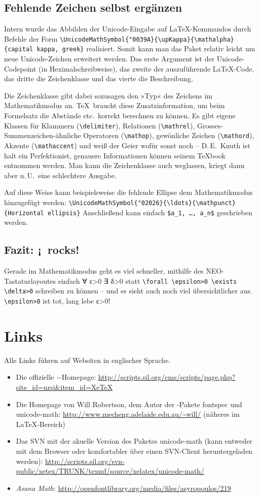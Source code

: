 \documentclass{scrartcl}
\begin{document}
\subsection{Fehlende Zeichen selbst ergänzen}
Intern wurde das Abbilden der Unicode-Eingabe auf \LaTeX-Kommandos durch Befehle der Form
\verb|\UnicodeMathSymbol{"0039A}{\upKappa}{\mathalpha}{capital kappa, greek}|
realisiert. Somit kann man das Paket relativ leicht um neue Unicode-Zeichen erweitert werden. Das erste Argument ist der Unicode-Codepoint (in Heximalschreibweise), das zweite der auszuführende \LaTeX-Code, das dritte die Zeichenklasse und das vierte die Beschreibung.

Die Zeichenklasse gibt dabei sozusagen den »Typ« des Zeichens im Mathematikmodus an. \TeX\ braucht diese Zusatzinformation, um beim Formelsatz die Abstände etc.\ korrekt berechnen zu können. Es gibt eigene Klassen für Klammern (\verb|\delimiter|), Relationen (\verb|\mathrel|), Grosses-Summenzeichen-ähnliche Operatoren (\verb|\mathop|), gewönliche Zeichen (\verb|\mathord|), Akzente (\verb|\mathaccent|) und weiß der Geier wofür sonst noch – D.\,E.~Knuth ist halt ein Perfektionist, genauere Informationen können seinem \TeX book entnommen werden. Man kann die Zeichenklasse auch weglassen, kriegt dann aber u.\,U.\ eine schlechtere Ausgabe.

Auf diese Weise kann beispielsweise die fehlende Ellipse dem Mathematikmodus hinzugefügt werden: \verb|\UnicodeMathSymbol{"02026}{\ldots}{\mathpunct}{Horizontal ellipsis}|
Anschließend kann einfach \verb|$a_1, …, a_n$| geschrieben werden.

\subsection{Fazit: ¡\XeTeX\ rocks!}
Gerade im Mathematikmodus geht es viel schneller, mithilfe des NEO-Tastaturlayoutes einfach ∀ ε>0 ∃ δ>0 statt \verb|\forall \epsilon>0 \exists \delta>0| schreiben zu können – und es sieht auch noch viel übersichtlicher aus. \verb|\epsilon>0| ist tot, lang lebe ε>0!

\section{Links}
Alle Links führen auf Websiten in englischer Sprache.
\begin{itemize}
\item Die offizielle \XeTeX−Homepage: \url{http://scripts.sil.org/cms/scripts/page.php?site_id=nrsi&item_id=XeTeX}
\item Die Homepage von Will Robertson, dem Autor der \XeTeX-Pakete fontspec und unicode-math: \url{http://www.mecheng.adelaide.edu.au/~will/}  (näheres im \LaTeX-Bereich)
\item Das SVN mit der akuelle Version des Paketes unicode-math (kann entweder mit dem Browser oder komfortabler über einen SVN-Client heruntergeladen werden): \url{http://scripts.sil.org/svn-public/xetex/TRUNK/texmf/source/xelatex/unicode-math/}
\item \emph{Asana Math}: \url{http://openfontlibrary.org/media/files/asyropoulos/219}
\end{itemize}
\end{document}
